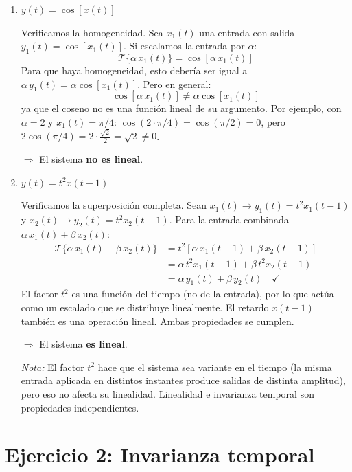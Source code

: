\documentclass[10pt,a4paper]{article}
\begin{document}
	\begin{enumerate}[label=\textbf{\alph*)}]
		\item $y(t) = \cos[x(t)]$
		
		Verificamos la homogeneidad. Sea $x_1(t)$ una entrada con salida $y_1(t) = \cos[x_1(t)]$. Si escalamos la entrada por $\alpha$:
		\[
		\mathcal{T}\{\alpha\,x_1(t)\} = \cos[\alpha\,x_1(t)]
		\]
		Para que haya homogeneidad, esto debería ser igual a $\alpha\,y_1(t) = \alpha\cos[x_1(t)]$. Pero en general:
		\[
		\cos[\alpha\,x_1(t)] \neq \alpha\cos[x_1(t)]
		\]
		ya que el coseno no es una función lineal de su argumento. Por ejemplo, con $\alpha = 2$ y $x_1(t) = \pi/4$: $\cos(2\cdot\pi/4) = \cos(\pi/2) = 0$, pero $2\cos(\pi/4) = 2\cdot\frac{\sqrt{2}}{2} = \sqrt{2} \neq 0$.
		
		$\Rightarrow$ El sistema \textbf{no es lineal}.
		
		\item $y(t) = t^2 x(t-1)$
		
		Verificamos la superposición completa. Sean $x_1(t) \to y_1(t) = t^2 x_1(t-1)$ y $x_2(t) \to y_2(t) = t^2 x_2(t-1)$. Para la entrada combinada $\alpha\,x_1(t) + \beta\,x_2(t)$:
		\begin{align*}
		\mathcal{T}\{\alpha\,x_1(t) + \beta\,x_2(t)\} &= t^2 [\alpha\,x_1(t-1) + \beta\,x_2(t-1)] \\
		&= \alpha\,t^2 x_1(t-1) + \beta\,t^2 x_2(t-1) \\
		&= \alpha\,y_1(t) + \beta\,y_2(t) \quad \checkmark
		\end{align*}
		El factor $t^2$ es una función del tiempo (no de la entrada), por lo que actúa como un escalado que se distribuye linealmente. El retardo $x(t-1)$ también es una operación lineal. Ambas propiedades se cumplen.
		
		$\Rightarrow$ El sistema \textbf{es lineal}.
		
		\textit{Nota:} El factor $t^2$ hace que el sistema sea variante en el tiempo (la misma entrada aplicada en distintos instantes produce salidas de distinta amplitud), pero eso no afecta su linealidad. Linealidad e invarianza temporal son propiedades independientes.
	\end{enumerate}

	\section*{Ejercicio 2: Invarianza temporal}
	
\end{document}
